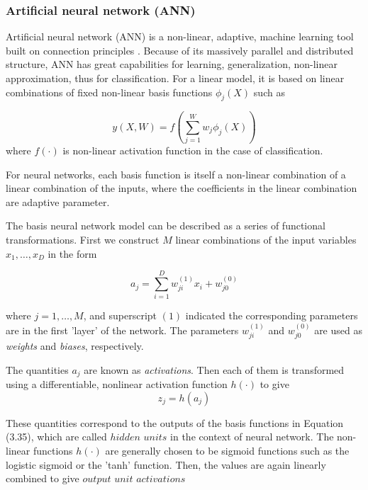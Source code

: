 \subsubsection{Artificial neural network (ANN)}
Artificial neural network (ANN) is a non-linear, adaptive, machine learning tool built on connection principles \citep{lek1999artificial, samarasinghe2006neural}. Because of its massively parallel and distributed structure, ANN has great capabilities for learning, generalization, non-linear approximation, thus for classification. For a linear model, it is based on linear combinations of fixed non-linear basis functions $\phi_{j}(X)$ such as

\begin{equation}
y(X,W)=f(\sum_{j=1}^{W}w_{j} \phi_{j}(X))
\end{equation}
where $f(\cdot)$ is non-linear activation function in the case of classification.

For neural networks, each basis function is itself a non-linear combination of a linear combination of the inputs, where the coefficients in the linear combination are adaptive parameter.

The basis neural network model can be described as a series of functional transformations. First we construct $M$ linear combinations of the input variables $x_{1},\ldots , x_{D}$ in the form

\begin{equation}
a_{j}=\sum_{i=1}^{D}w_{ji}^{(1)}x_{i}+w_{j0}^{(0)}
\end{equation}

where $j=1, \ldots ,M$, and superscript $(1)$ indicated the corresponding parameters are in the first 'layer' of the network. The parameters $w_{ji}^{(1)}$ and $w_{j0}^{(0)}$ are used as \textit{weights} and \textit{biases}, respectively. 

The quantities $a_{j}$ are known as \textit{activations}. Then each of them is transformed using a differentiable, nonlinear activation function $h(\cdot)$ to give
\begin{equation}
z_{j}=h(a_{j})
\end{equation}

These quantities correspond to the outputs of the basis functions in Equation (3.35), which are called $hidden$ $units$ in the context of neural network.
The non-linear functions $h(\cdot)$ are generally chosen to be sigmoid functions such as the logistic sigmoid or the 'tanh' function. Then, the values are again linearly combined to give $output$ $unit$ $activations$

